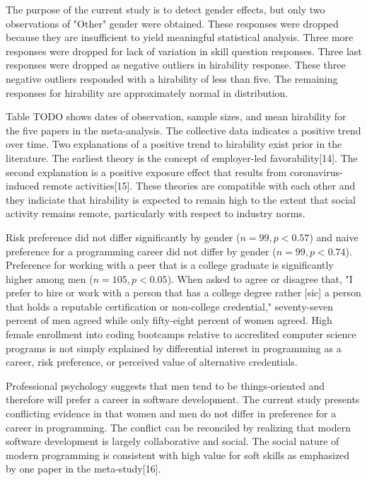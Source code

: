 \documentclass[review]{elsarticle}
\begin{document}
The purpose of the current study is to detect gender effects, but only two observations of "Other" gender were obtained.
These responses were dropped because they are insufficient to yield meaningful statistical analysis.
Three more responses were dropped for lack of variation in skill question responses.
Three last responses were dropped as negative outliers in hirability response.
These three negative outliers responded with a hirability of less than five.
The remaining responses for hirability are approximately normal in distribution.

Table TODO shows dates of observation, sample sizes, and mean hirability for the five papers in the meta-analysis.
The collective data indicates a positive trend over time.
Two explanations of a positive trend to hirability exist prior in the literature.
The earliest theory is the concept of employer-led favorability[14].
The second explanation is a positive exposure effect that results from coronavirus-induced remote activities[15].
These theories are compatible with each other and they indiciate that hirability is expected to remain high
to the extent that social activity remains remote, particularly with respect to industry norms.

Risk preference did not differ significantly by gender ($n = 99, p < 0.57$)
and naive preference for a programming career did not differ by gender ($n = 99, p < 0.74$).
Preference for working with a peer that is a college graduate is significantly higher among men ($n = 105, p < 0.05$).
When asked to agree or disagree that, "I prefer to hire or work with a person that has a college degree
rather [sic] a person that holds a reputable certification or non-college credential,"
seventy-seven percent of men agreed while only fifty-eight percent of women agreed.
High female enrollment into coding bootcamps
relative to accredited computer science programs is not simply explained
by differential interest in programming as a career,
risk preference,
or perceived value of alternative credentials.

Professional psychology suggests that men tend to be things-oriented and therefore will prefer a career in software development.
The current study presents conflicting evidence in that women and men do not differ in preference for a career in programming.
The conflict can be reconciled by realizing that modern software development is largely collaborative and social.
The social nature of modern programming is consistent with high value for soft skills as emphasized by one paper in the meta-study[16].
\end{document}
